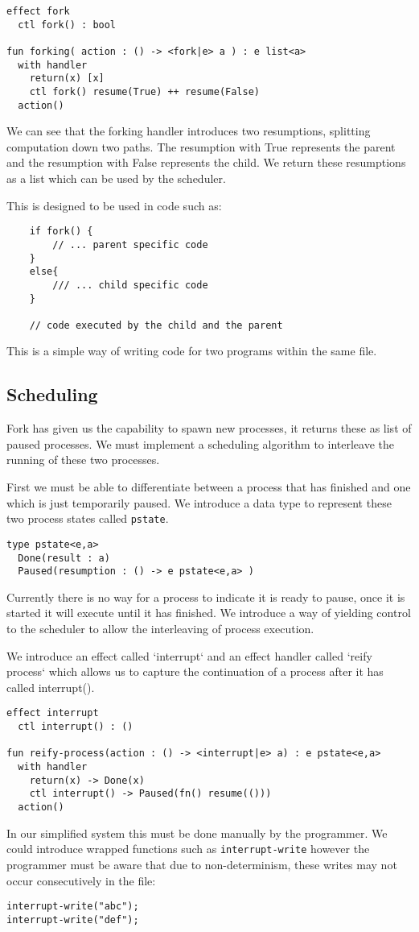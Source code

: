 \documentclass[logo,bsc,singlespacing,parskip]{infthesis}
\begin{document}
\begin{lstlisting}
effect fork
  ctl fork() : bool     

fun forking( action : () -> <fork|e> a ) : e list<a>
  with handler
    return(x) [x]
    ctl fork() resume(True) ++ resume(False)
  action()
\end{lstlisting}

We can see that the forking handler introduces two resumptions, splitting computation down two paths. The resumption with True represents the parent and the resumption with False represents the child. We return these resumptions as a list which can be used by the scheduler.

This is designed to be used in code such as:
\begin{lstlisting}
    if fork() {
        // ... parent specific code
    }
    else{
        /// ... child specific code
    }
    
    // code executed by the child and the parent
\end{lstlisting}
This is a simple way of writing code for two programs within the same file.

\subsection*{Scheduling}
Fork has given us the capability to spawn new processes, it returns these as list of paused processes. We must implement a scheduling algorithm to interleave the running of these two processes.

First we must be able to differentiate between a process that has finished and one which is just temporarily paused. We introduce a data type to represent these two process states called \texttt{pstate}. 
\begin{lstlisting}
type pstate<e,a>
  Done(result : a)
  Paused(resumption : () -> e pstate<e,a> )
\end{lstlisting}

Currently there is no way for a process to indicate it is ready to pause, once it is started it will execute until it has finished. We introduce a way of yielding control to the scheduler to allow the interleaving of process execution.

We introduce an effect called `interrupt` and an effect handler called `reify process` which allows us to capture the continuation of a process after it has called interrupt().
\begin{lstlisting}
effect interrupt
  ctl interrupt() : ()

fun reify-process(action : () -> <interrupt|e> a) : e pstate<e,a> 
  with handler  
    return(x) -> Done(x)
    ctl interrupt() -> Paused(fn() resume(()))
  action()
\end{lstlisting}
In our simplified system this must be done manually by the programmer. We could introduce wrapped functions such as \texttt{interrupt-write} however the programmer must be aware that due to non-determinism, these writes may not occur consecutively in the file:
\begin{lstlisting}
interrupt-write("abc");
interrupt-write("def");
\end{lstlisting}
\end{document}
